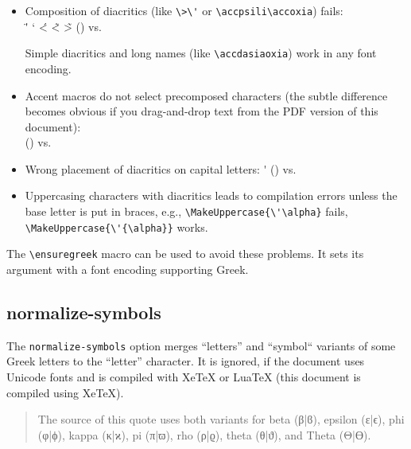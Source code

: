 \documentclass[a4paper]{scrartcl}
\makeatletter
\newcommand{\engine}{XeTeX}
\newcommand{\engine}{LuaTeX}
\newcommand{\engine}{pdfTeX}
\newcommand{\cs}[1]{\texttt{\textbackslash#1}}
\newcommand{\currentEncoding}{\f@encoding}
\makeatother
\begin{document}
  \begin{itemize}

  \item Composition of diacritics (like \verb|\>\'| or \verb|\accpsili\accoxia|)
        fails: \\
        \"'{\iota} \>`\eta{}
        \'<{\omicron} \~<{\upsilon} \~>{\omega} (\currentEncoding) vs.
        \ensuregreek{\"'{\iota} \>`\eta{}
        \'<{\omicron} \~<{\upsilon} \~>{\omega} (\currentEncoding)}

        Simple diacritics and long names (like \verb+\accdasiaoxia+) work in
        any font encoding.

  \item Accent macros do not select precomposed characters
        (the subtle difference becomes obvious if you drag-and-drop text from
        the PDF version of this document):
        \\
        \accdasiaoxia\alpha{} (\currentEncoding) vs.
        \ensuregreek{\accdasiaoxia\alpha{} (\currentEncoding)}

  \item Wrong placement of diacritics on capital letters:
        \'\Alpha{} \accdasiaoxia\Omega{} (\currentEncoding) vs.
        \ensuregreek{\'\Alpha{} \accdasiaoxia\Omega{} (\currentEncoding)}

  \item Uppercasing characters with diacritics leads to compilation errors
        unless the base letter is put in braces,
        e.g., \verb|\MakeUppercase{\'\alpha}| fails,\\
              \verb|\MakeUppercase{\'{\alpha}}| works.
  \end{itemize}
  The \cs{ensuregreek} macro can be used to avoid these problems.
  It sets its argument with a font encoding supporting Greek.%
\fi


\subsection{normalize-symbols}

The \texttt{normalize-symbols} option merges ``letters'' and ``symbol``
variants of some Greek letters to the ``letter'' character. It is ignored,
if the document uses Unicode fonts and is compiled with XeTeX or LuaTeX
(this document is compiled using \engine).
\begin{quote}
  The source of this quote uses both variants for beta (β|ϐ),
  epsilon (ε|ϵ), phi (φ|ϕ), kappa (κ|ϰ), pi (π|ϖ), rho (ρ|ϱ), theta (θ|ϑ),
  and Theta (Θ|ϴ).
\end{quote}
\end{document}

